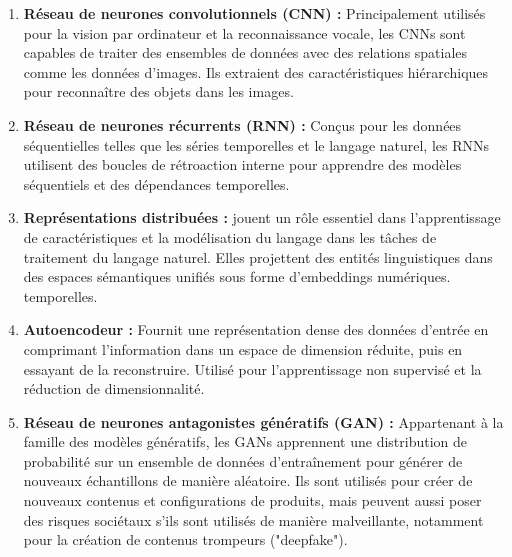 \documentclass{report}
\begin{document}
\begin{enumerate}
\item \textbf {Réseau de neurones convolutionnels (CNN) :} Principalement utilisés pour la vision par ordinateur et la reconnaissance vocale, les CNNs sont capables de traiter des ensembles de données avec des relations spatiales comme les données d'images. Ils extraient des caractéristiques hiérarchiques pour reconnaître des objets dans les images. \\

\item \textbf {Réseau de neurones récurrents (RNN) :} Conçus pour les données séquentielles telles que les séries temporelles et le langage naturel, les RNNs utilisent des boucles de rétroaction interne pour apprendre des modèles séquentiels et des dépendances temporelles.\\

\item \textbf {Représentations distribuées :} jouent un rôle essentiel dans l'apprentissage de caractéristiques et la modélisation du langage dans les tâches de traitement du langage naturel. Elles projettent des entités linguistiques dans des espaces sémantiques unifiés sous forme d'embeddings numériques. temporelles.\\

\item \textbf {Autoencodeur :} Fournit une représentation dense des données d'entrée en comprimant l'information dans un espace de dimension réduite, puis en essayant de la reconstruire. Utilisé pour l'apprentissage non supervisé et la réduction de dimensionnalité.\\

\item \textbf {Réseau de neurones antagonistes génératifs (GAN) :} Appartenant à la famille des modèles génératifs, les GANs apprennent une distribution de probabilité sur un ensemble de données d'entraînement pour générer de nouveaux échantillons de manière aléatoire. Ils sont utilisés pour créer de nouveaux contenus et configurations de produits, mais peuvent aussi poser des risques sociétaux s'ils sont utilisés de manière malveillante, notamment pour la création de contenus trompeurs ("deepfake").

\end{enumerate}
\newpage
\end{document}
